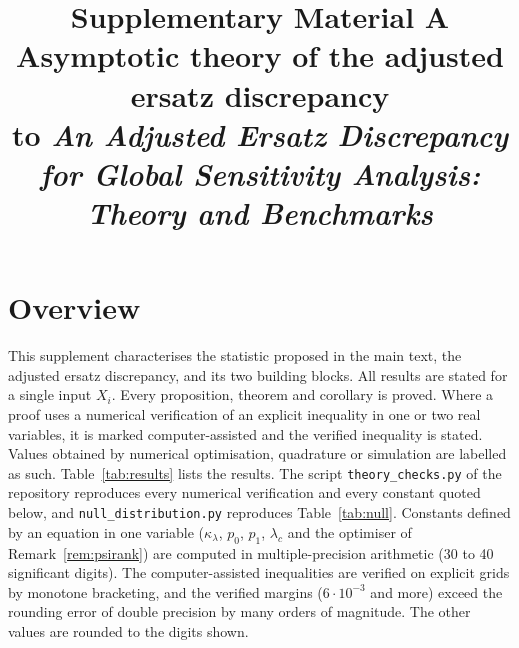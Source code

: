 \documentclass[11pt,a4paper]{article}
\title{\large\bfseries Supplementary Material A\\[3pt]
Asymptotic theory of the adjusted ersatz discrepancy\\[3pt]
\normalsize to \emph{An Adjusted Ersatz Discrepancy for Global Sensitivity Analysis: Theory and Benchmarks}}
\author{}
\date{}
\theoremstyle{definition}
\theoremstyle{remark}
\begin{document}
\maketitle

\section{Overview}\label{sec:overview}

This supplement characterises the statistic proposed in the main text, the adjusted ersatz discrepancy, and its two building blocks. All results are stated for a single input $X_i$. Every proposition, theorem and corollary is proved. Where a proof uses a numerical verification of an explicit inequality in one or two real variables, it is marked computer-assisted and the verified inequality is stated. Values obtained by numerical optimisation, quadrature or simulation are labelled as such. Table~\ref{tab:results} lists the results. The script \texttt{theory\_checks.py} of the repository reproduces every numerical verification and every constant quoted below, and \texttt{null\_distribution.py} reproduces Table~\ref{tab:null}. Constants defined by an equation in one variable ($\kappa_\lambda$, $p_0$, $p_1$, $\lambda_c$ and the optimiser of Remark~\ref{rem:psirank}) are computed in multiple-precision arithmetic (30 to 40 significant digits). The computer-assisted inequalities are verified on explicit grids by monotone bracketing, and the verified margins ($6\cdot10^{-3}$ and more) exceed the rounding error of double precision by many orders of magnitude. The other values are rounded to the digits shown.
\end{document}
